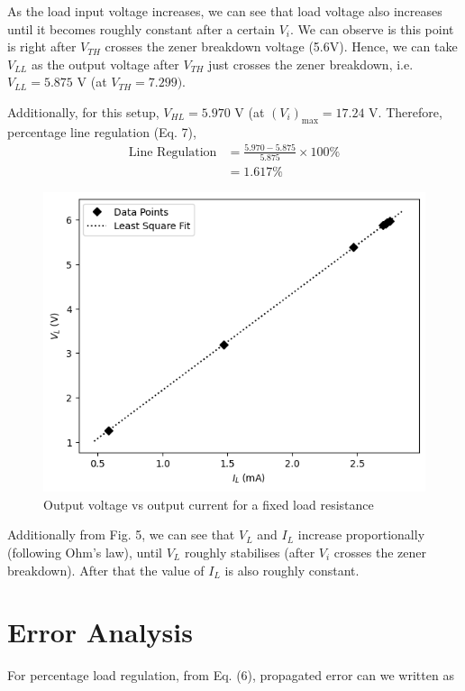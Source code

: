     As the load input voltage increases, we can see that load voltage also increases until it becomes roughly constant after a certain $V_i$. We can observe is this point is right after $V_{TH}$  crosses the zener breakdown voltage (5.6V). Hence, we can take $V_{LL}$ as the output voltage after $V_{TH}$ just crosses the zener breakdown, i.e. $V_{LL} = 5.875$ V (at $V_{TH}=7.299)$.

    Additionally, for this setup, $V_{HL} = 5.970$ V (at $(V_i)_\text{max}=17.24$ V. Therefore, percentage line regulation (Eq. 7),
    \begin{align*}
        \text{Line Regulation} &= \frac{5.970-5.875}{5.875}\times 100\%\\
        &=1.617\%
    \end{align*}

     \begin{figure}
        \centering
        \includegraphics[width=0.9\columnwidth]{images/g4.png}
        \caption{Output voltage vs output current for a fixed load resistance}
        \label{fig:4}
    \end{figure}

    Additionally from Fig. 5, we can see that $V_L$ and $I_L$ increase proportionally (following Ohm's law), until $V_L$ roughly stabilises (after $V_i$ crosses the zener breakdown). After that the value of $I_L$ is also roughly constant. 

\section{Error Analysis}
For percentage load regulation, from Eq. (6), propagated error can we written as

